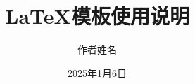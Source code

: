 \documentclass[unicode,master]{scutthesis} %
\begin{document}
	\title{LaTeX模板使用说明}	
	\author{作者姓名}	
	\date{2025年1月6日}
	\maketitle	
	\frontmatter	%
	\tableofcontents	%
	
	\begingroup
		\renewcommand*{\addvspace}[1]{}
		\newcommand{\loflabel}{图} 
		\renewcommand{\numberline}[1]{\loflabel~#1\hspace*{1em}}	
		\listoffigures
		
		\newcommand{\lotlabel}{表}
		\renewcommand{\numberline}[1]{\lotlabel~#1\hspace*{1em}}
		\listoftables
	\endgroup

	
	\mainmatter %
	
    \pagestyle{fancy}	%
	
\end{document}
